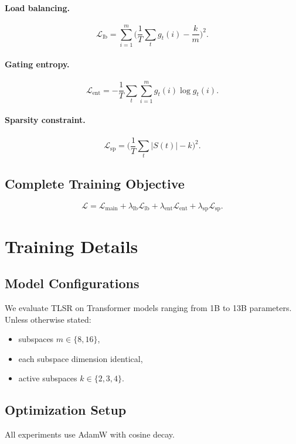\documentclass{article}
\theoremstyle{plain}
\theoremstyle{definition}
\theoremstyle{remark}
\begin{document}
\paragraph{Load balancing.}
\[
\mathcal{L}_{\mathrm{lb}}
= \sum_{i=1}^{m}
\Big(
\frac{1}{T}\sum_{t} g_t(i)
- \frac{k}{m}
\Big)^2.
\]

\paragraph{Gating entropy.}
\[
\mathcal{L}_{\mathrm{ent}}
=
-\frac{1}{T}\sum_{t}
\sum_{i=1}^{m} 
g_t(i)\log g_t(i).
\]

\paragraph{Sparsity constraint.}
\[
\mathcal{L}_{\mathrm{sp}}
=
\Big(
\frac{1}{T}\sum_t |S(t)| - k
\Big)^2.
\]

\subsection{Complete Training Objective}
\[
\mathcal{L}
=
\mathcal{L}_{\text{main}}
+
\lambda_{\mathrm{lb}} \mathcal{L}_{\mathrm{lb}}
+
\lambda_{\mathrm{ent}} \mathcal{L}_{\mathrm{ent}}
+
\lambda_{\mathrm{sp}} \mathcal{L}_{\mathrm{sp}}.
\]

\section{Training Details}

\subsection{Model Configurations}
We evaluate TLSR on Transformer models ranging from 1B to 13B parameters.
Unless otherwise stated:
\begin{itemize}
\item subspaces $m\in\{8,16\}$,
\item each subspace dimension identical,
\item active subspaces $k\in\{2,3,4\}$.
\end{itemize}

\subsection{Optimization Setup}
All experiments use AdamW with cosine decay.
\end{document}
